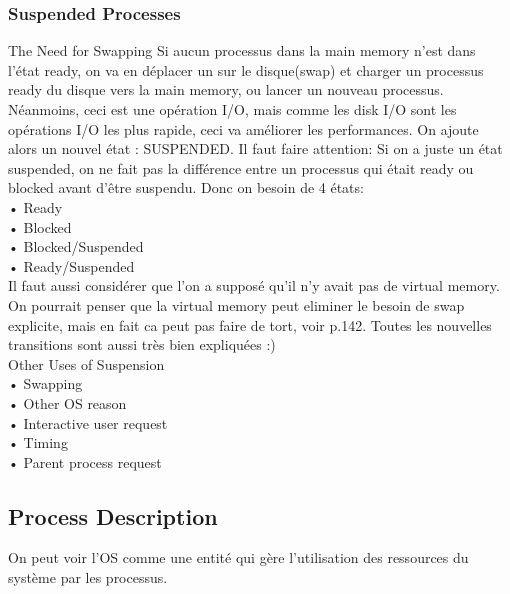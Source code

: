 \subsubsection{Suspended Processes}
The Need for Swapping
Si aucun processus dans la main memory n’est dans l’état ready, on va en déplacer un sur le disque(swap) et charger un processus ready du disque vers la main memory, ou lancer un nouveau processus. Néanmoins, ceci est une opération I/O, mais comme les disk I/O sont les opérations I/O les plus rapide, ceci va améliorer les performances. On ajoute alors un nouvel état : SUSPENDED. Il faut faire attention: Si on a juste un état suspended, on ne fait pas la différence entre un processus qui était ready ou blocked avant d’être suspendu. Donc on besoin de 4 états: \\
• Ready \\
• Blocked \\
• Blocked/Suspended  \\
• Ready/Suspended \\
Il faut aussi considérer que l’on a supposé qu’il n’y avait pas de virtual memory. On pourrait penser que la virtual memory peut eliminer le besoin de swap explicite, mais en fait ca peut pas faire de tort, voir p.142. Toutes les nouvelles transitions sont aussi très bien expliquées :) \\
Other Uses of Suspension \\
• Swapping \\
• Other OS reason \\
• Interactive user request \\
• Timing \\
• Parent process request \\
\subsection{Process Description}
On peut voir l’OS comme une entité qui gère l’utilisation des ressources du système par les processus.
